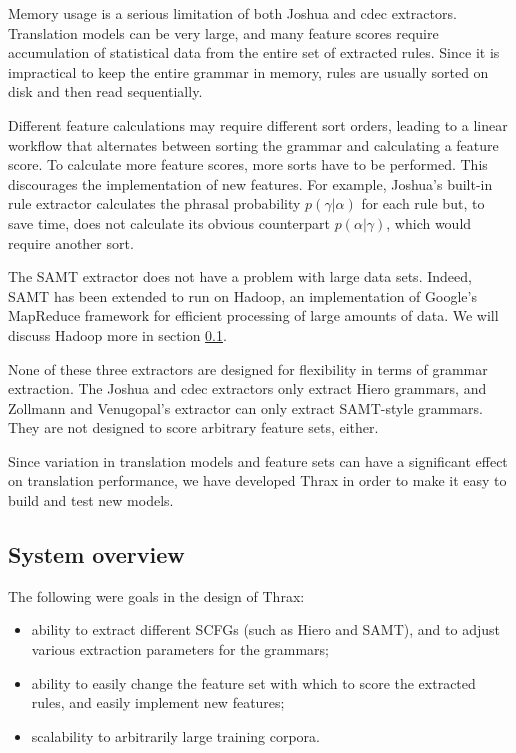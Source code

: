\documentclass[11pt]{article}
\begin{document}
Memory usage is a serious limitation of both Joshua and cdec extractors. Translation models can be very large, and many feature scores require accumulation of statistical data from the entire set of extracted rules. Since it is impractical to keep the entire grammar in memory, rules are usually sorted on disk and then read sequentially.

Different feature calculations may require different sort orders, leading to a linear workflow that alternates between sorting the grammar and calculating a feature score. To calculate more feature scores, more sorts have to be performed. This discourages the implementation of new features. For example, Joshua's built-in rule extractor calculates the phrasal probability $p(\gamma|\alpha)$ for each rule but, to save time, does not calculate its obvious counterpart $p(\alpha|\gamma)$, which would require another sort.

The SAMT extractor does not have a problem with large data sets.
Indeed, SAMT has been extended \cite{venugopal2009hadoop} to run on
Hadoop, an implementation of Google's MapReduce framework for
efficient processing of large amounts of data.  We will discuss Hadoop more in section \ref{design}.

None of these three extractors are designed for flexibility in terms of grammar extraction. The Joshua and cdec extractors only extract Hiero grammars, and Zollmann and Venugopal's extractor can only extract SAMT-style grammars. They are not designed to score arbitrary feature sets, either.

Since variation in translation models and feature sets can have a significant effect on translation performance, we have developed Thrax in order to make it easy to build and test new models. 

\subsection{System overview}
\label{design}

The following were goals in the design of Thrax:

\begin{itemize}
\item ability to extract different SCFGs (such as Hiero and SAMT), and to adjust various extraction parameters for the grammars;
\item ability to easily change the feature set with which to score the extracted rules, and easily implement new features;
\item scalability to arbitrarily large training corpora.
\end{itemize}
\end{document}
